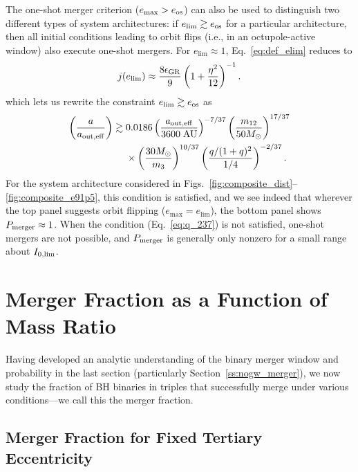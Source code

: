 \documentclass[
        fleqn,
        usenatbib,
    ]{mnras}
\newcommand*{\p}[1]{\left(#1\right)}
\begin{document}
The one-shot merger criterion ($e_{\max} > e_{\rm os}$) can also be used to
distinguish two different types of system architectures: if $e_{\lim} \gtrsim
e_{\rm os}$ for a particular architecture, then all initial conditions leading
to orbit flips (i.e., in an octupole-active window) also execute one-shot
mergers. For $e_{\lim} \approx 1$, Eq.~\eqref{eq:def_elim} reduces to
\begin{align}
    j(e_{\lim}) \approx \frac{8\epsilon_{\rm GR}}{9}\p{1 +
        \frac{\eta^2}{12}}^{-1}.
\end{align}
which lets us rewrite the constraint $e_{\lim} \gtrsim e_{\rm os}$ as
\begin{align}
    \p{\frac{a}{a_{\rm out, eff}}} \gtrsim{}&
        0.0186
        \p{\frac{a_{\rm out, eff}}{3600\;\mathrm{AU}}}^{-7/37}
        \p{\frac{m_{12}}{50M_{\odot}}}^{17/37}\nonumber\\
        &\times\p{\frac{30M_{\odot}}{m_3}}^{10/37}
        \p{\frac{q / (1 + q)^2}{1/4}}^{-2/37}.\label{eq:q_237}
\end{align}
For the system architecture considered in
Figs.~\ref{fig:composite_dist}--\ref{fig:composite_e91p5}, this condition is
satisfied, and we see indeed that wherever the top panel suggests orbit flipping
($e_{\max} = e_{\lim}$), the bottom panel shows $P_{\rm merger} \approx 1$. When
the condition (Eq.~\ref{eq:q_237}) is not satisfied, one-shot mergers are not
possible, and $P_{\rm merger}$ is generally only nonzero for a small range about
$I_{\rm 0, \lim}$.

\section{Merger Fraction as a Function of Mass Ratio}\label{s:merger_frac}

Having developed an analytic understanding of the binary merger window and
probability in the last section (particularly Section~\ref{ss:nogw_merger}), we
now study the fraction of BH binaries in triples that successfully merge under
various conditions---we call this the merger fraction.

\subsection{Merger Fraction for Fixed Tertiary Eccentricity}
\end{document}

